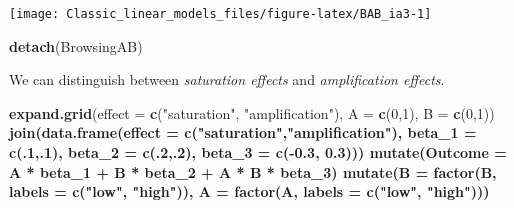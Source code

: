 \documentclass[]{svmono}
\newenvironment{Shaded}{\begin{snugshade}}{\end{snugshade}}
\newcommand{\KeywordTok}[1]{\textcolor[rgb]{0.13,0.29,0.53}{\textbf{#1}}}
\newcommand{\DataTypeTok}[1]{\textcolor[rgb]{0.13,0.29,0.53}{#1}}
\newcommand{\DecValTok}[1]{\textcolor[rgb]{0.00,0.00,0.81}{#1}}
\newcommand{\FloatTok}[1]{\textcolor[rgb]{0.00,0.00,0.81}{#1}}
\newcommand{\StringTok}[1]{\textcolor[rgb]{0.31,0.60,0.02}{#1}}
\newcommand{\OperatorTok}[1]{\textcolor[rgb]{0.81,0.36,0.00}{\textbf{#1}}}
\newcommand{\NormalTok}[1]{#1}
\begin{document}
\texttt{[image: Classic\_linear\_models\_files/figure-latex/BAB\_ia3-1]}

\begin{Shaded}
\begin{Highlighting}[]
\KeywordTok{detach}\NormalTok{(BrowsingAB)}
\end{Highlighting}
\end{Shaded}

We can distinguish between \emph{saturation effects} and
\emph{amplification effects}.

\begin{Shaded}
\begin{Highlighting}[]
    \KeywordTok{expand.grid}\NormalTok{(}\DataTypeTok{effect =} \KeywordTok{c}\NormalTok{(}\StringTok{"saturation"}\NormalTok{, }\StringTok{"amplification"}\NormalTok{), }
                            \DataTypeTok{A =} \KeywordTok{c}\NormalTok{(}\DecValTok{0}\NormalTok{,}\DecValTok{1}\NormalTok{),}
                            \DataTypeTok{B =} \KeywordTok{c}\NormalTok{(}\DecValTok{0}\NormalTok{,}\DecValTok{1}\NormalTok{)) }\OperatorTok{%
\StringTok{        }\KeywordTok{join}\NormalTok{(}\KeywordTok{data.frame}\NormalTok{(}\DataTypeTok{effect =} \KeywordTok{c}\NormalTok{(}\StringTok{"saturation"}\NormalTok{,}\StringTok{"amplification"}\NormalTok{),}
                                        \DataTypeTok{beta_1 =} \KeywordTok{c}\NormalTok{(.}\DecValTok{1}\NormalTok{,.}\DecValTok{1}\NormalTok{),}
                                        \DataTypeTok{beta_2 =} \KeywordTok{c}\NormalTok{(.}\DecValTok{2}\NormalTok{,.}\DecValTok{2}\NormalTok{),}
                                        \DataTypeTok{beta_3 =} \KeywordTok{c}\NormalTok{(}\OperatorTok{-}\FloatTok{0.3}\NormalTok{, }\FloatTok{0.3}\NormalTok{)))  }\OperatorTok{%
\StringTok{        }\KeywordTok{mutate}\NormalTok{(}\DataTypeTok{Outcome =}\NormalTok{ A }\OperatorTok{*}\StringTok{ }\NormalTok{beta_}\DecValTok{1} \OperatorTok{+}\StringTok{ }\NormalTok{B }\OperatorTok{*}\StringTok{ }\NormalTok{beta_}\DecValTok{2} \OperatorTok{+}\StringTok{ }\NormalTok{A }\OperatorTok{*}\StringTok{ }\NormalTok{B }\OperatorTok{*}\StringTok{ }\NormalTok{beta_}\DecValTok{3}\NormalTok{) }\OperatorTok{%
\StringTok{        }\KeywordTok{mutate}\NormalTok{(}\DataTypeTok{B =} \KeywordTok{factor}\NormalTok{(B, }\DataTypeTok{labels =} \KeywordTok{c}\NormalTok{(}\StringTok{"low"}\NormalTok{, }\StringTok{"high"}\NormalTok{)),}
                     \DataTypeTok{A =} \KeywordTok{factor}\NormalTok{(A, }\DataTypeTok{labels =} \KeywordTok{c}\NormalTok{(}\StringTok{"low"}\NormalTok{, }\StringTok{"high"}\NormalTok{))) }\OperatorTok{%
}}}}
\end{Highlighting}
\end{Shaded}
\end{document}
